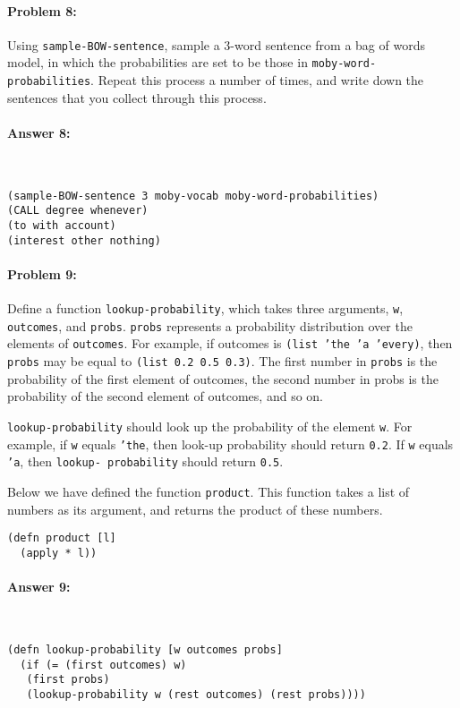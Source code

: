 \documentclass[12pt, letterpaper]{article}
\begin{document}
\hrulefill
\paragraph{Problem 8:}

Using \texttt{sample-BOW-sentence}, sample a 3-word sentence from a
bag of words model, in which the probabilities are set to be those in
\texttt{moby-word-probabilities}. Repeat this process a number of
times, and write down the sentences that you collect through this
process.

\paragraph{Answer 8:}~\begin{lstlisting}
(sample-BOW-sentence 3 moby-vocab moby-word-probabilities)
(CALL degree whenever)
(to with account)
(interest other nothing)
\end{lstlisting}

\hrulefill
\paragraph{Problem 9:}

Define a function \texttt{lookup-probability}, which takes three
arguments, \texttt{w}, \texttt{outcomes}, and
\texttt{probs}. \texttt{probs} represents a probability distribution
over the elements of \texttt{outcomes}. For example, if outcomes is
\texttt{(list 'the 'a 'every)}, then \texttt{probs} may be equal to
\texttt{(list 0.2 0.5 0.3)}. The first number in \texttt{probs} is the
probability of the first element of outcomes, the second number in
probs is the probability of the second element of outcomes, and so on.

\texttt{lookup-probability} should look up the probability of the
element \texttt{w}. For example, if \texttt{w} equals \texttt{'the},
then look-up probability should return \texttt{0.2}. If \texttt{w}
equals \texttt{'a}, then \texttt{lookup- probability} should return
\texttt{0.5}.

Below we have defined the function \texttt{product}. This function takes a list
of numbers as its argument, and returns the product of these numbers.

\begin{lstlisting}
(defn product [l]
  (apply * l))
\end{lstlisting}

\paragraph{Answer 9:}~\begin{lstlisting}
(defn lookup-probability [w outcomes probs]
  (if (= (first outcomes) w)
   (first probs)
   (lookup-probability w (rest outcomes) (rest probs))))
\end{lstlisting}
\end{document}
